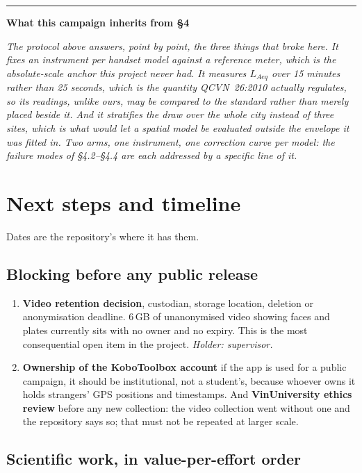 \documentclass[11pt,a4paper]{article}
\newenvironment{caveat}[1]
 {\par\medskip\noindent\begin{minipage}{\linewidth}%
 \color{warnc}\rule{2pt}{\baselineskip}\hspace{.6em}\textbf{#1}\par\vspace{.2em}
 \hspace*{1.4em}\begin{minipage}{\dimexpr\linewidth-1.4em\relax}\small\itshape}
 {\end{minipage}\end{minipage}\par\medskip}
\begin{document}
\begin{caveat}{What this campaign inherits from §4}
The protocol above answers, point by point, the three things that broke here. It
fixes an instrument per handset model against a reference meter, which is the
absolute-scale anchor this project never had. It measures $L_{Aeq}$ over 15
minutes rather than 25 seconds, which is the quantity QCVN~26:2010 actually
regulates, so its readings, unlike ours, may be compared to the standard
rather than merely placed beside it. And it stratifies the draw over the whole
city instead of three sites, which is what would let a spatial model be
evaluated outside the envelope it was fitted in. Two arms, one instrument, one
correction curve per model: the failure modes of §4.2--§4.4 are each addressed
by a specific line of it.
\end{caveat}

\section{Next steps and timeline}

Dates are the repository's where it has them.

\subsection{Blocking before any public release}\label{sec:blocking}

\begin{enumerate}
 \item \textbf{Video retention decision}, custodian, storage location,
 deletion or anonymisation deadline. 6\,GB of unanonymised video showing
 faces and plates currently sits with no owner and no expiry. This is the
 most consequential open item in the project. \emph{Holder: supervisor.}
 \item \label{item:kobo}\textbf{Ownership of the KoboToolbox account} if the
 app is used for a public campaign, it should be institutional, not a student's, because
 whoever owns it holds strangers' GPS positions and timestamps. And
 \textbf{VinUniversity ethics review} before any new collection: the video
 collection went without one and the repository says so; that must not be
 repeated at larger scale.
\end{enumerate}

\subsection{Scientific work, in value-per-effort order}\label{sec:sciwork}
\end{document}
